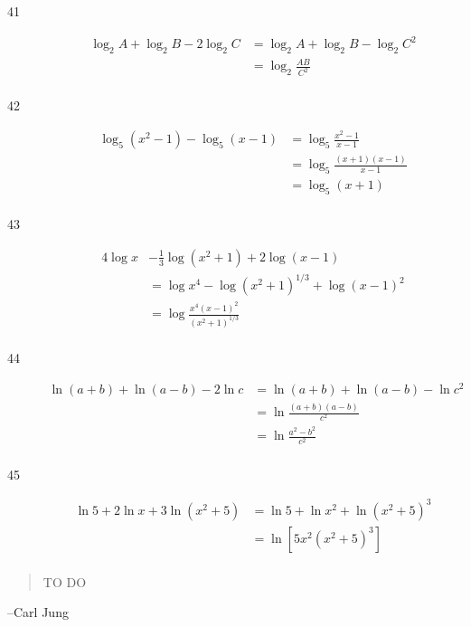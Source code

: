 \documentclass{exam}
\begin{document}
\begin{description}
      \item[41] 
        \begin{align*}
          \log_2 A + \log_2 B - 2 \log_2 C &= \log_2 A + \log_2 B - \log_2 C^2 \\
                                           &= \boxed{\log_2 \frac{AB}{C^2}} \\
        \end{align*}

      \item[42] 
        \begin{align*}
          \log_5 (x^2 - 1) - \log_5 (x - 1) &= \log_5 \frac{x^2 - 1}{x - 1} \\
                                            &= \log_5 \frac{(x + 1)(x - 1)}{x - 1} \\
                                            &= \boxed{\log_5 (x + 1)} \\
        \end{align*}

      \item[43] 
        \begin{align*}
          4 \log x &- \frac{1}{3} \log (x^2 + 1) + 2 \log (x - 1) \\
                   &= \log x^4 - \log (x^2 + 1)^{1/3} + \log (x - 1)^2 \\
                   &= \boxed{\log \frac{x^4 (x - 1)^2}{(x^2 + 1)^{1/3}}} \\
        \end{align*}

      \item[44] 
        \begin{align*}
          \ln(a + b) + \ln(a - b) - 2 \ln c &= \ln(a + b) + \ln(a - b) - \ln c^2 \\
                                            &= \ln \frac{(a + b)(a - b)}{c^2} \\
                                            &= \boxed{\ln \frac{a^2 - b^2}{c^2}} \\
        \end{align*}

      \item[45] 
        \begin{align*}
          \ln 5 + 2 \ln x + 3 \ln (x^2 + 5) &= \ln 5 + \ln x^2 + \ln (x^2 + 5)^3 \\
                                            &= \boxed{\ln \left[ 5x^2 (x^2 + 5)^3 \right]} \\
        \end{align*}

    \end{description}

  \else
    \vspace{2 cm}
    \begin{quote}
      \begin{em}
        TO DO
      \end{em}
    \end{quote}

    \hspace{1 cm} --Carl Jung
  \fi
\end{document}
